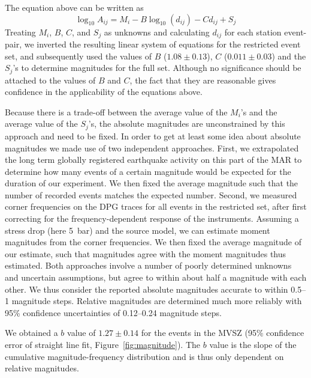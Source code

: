 \documentclass[aguplus]{aguplus}
\newlength{\tw}
\begin{document}
\begin{article}
The equation above can be written as
\begin{equation}
\log_{10} A_{ij}= M_i - B \log_{10}(d_{ij}) - C d_{ij} + S_{j}
\end{equation}
Treating $M_i$, $B$, $C$, and $S_j$ as unknowns and calculating
$d_{ij}$ for each station event-pair, we inverted the resulting linear
system of equations for the restricted event set, and subsequently
used the values of $B$ ($1.08 \pm 0.13$), $C$ ($0.011\pm0.03$) and the
$S_{j}$'s to determine magnitudes for the full set.
Although no significance should be attached to the values of $B$ and
$C$, the fact that they are reasonable gives confidence in the
applicability of the equations above.

Because there is a trade-off between the average
value of the $M_i$'s and the average value of the $S_j$'s, the absolute
magnitudes are unconstrained by this approach and need to be fixed.
In order to get at least some idea about absolute magnitudes we made
use of two independent
approaches. First, we extrapolated the long term globally registered earthquake activity on this
part of the MAR to determine how many events of a certain magnitude
would be expected for the duration of our experiment. We then fixed the
average magnitude such that the number of recorded events matches the
expected number.  Second, we measured corner frequencies on the DPG
traces for all
events in the restricted set, after first correcting for the
frequency-dependent response of the instruments. Assuming a stress drop (here 5~bar) and the
\citet{brune70} source model, we can estimate moment
magnitudes from the corner frequencies. We then fixed the average magnitude of our estimate, such
that magnitudes agree with the moment magnitudes thus estimated.
Both approaches involve a number of poorly determined unknowns and
uncertain assumptions, but agree to within about half a magnitude with
each other.  We thus consider the reported absolute magnitudes
accurate to within 0.5--1 magnitude steps.  Relative magnitudes are
determined much more reliably with 95\% confidence uncertainties
of 0.12--0.24 magnitude steps.

We obtained a $b$ value of  $1.27\pm0.14$ for the events in the MVSZ (95\%
confidence error of straight line fit, Figure~\ref{fig:magnitude}).
The $b$ value is the slope of
the cumulative magnitude-frequency distribution and is thus only
dependent on relative magnitudes.


\end{article}
\end{document}
